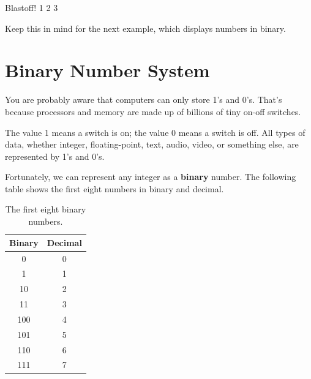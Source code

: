 \begin{stdout}
Blastoff!
1
2
3
\end{stdout}

Keep this in mind for the next example, which displays numbers in binary.

\section{Binary Number System}
\label{binary}

You are probably aware that computers can only store 1's and 0's.
That's because processors and memory are made up of billions of tiny on-off switches.

The value 1 means a switch is on; the value 0 means a switch is off.
All types of data, whether integer, floating-point, text, audio, video, or something else, are represented by 1's and 0's.


Fortunately, we can represent any integer as a {\bf binary} number.
The following table shows the first eight numbers in binary and decimal.


\begin{table}[!ht]
\begin{center}
\begin{tabular}{|c|c|}
\hline
Binary & Decimal \\
\hline
0 & 0 \\
\hline
1 & 1 \\
\hline
10 & 2 \\
\hline
11 & 3 \\
\hline
100 & 4 \\
\hline
101 & 5 \\
\hline
110 & 6 \\
\hline
111 & 7 \\
\hline
\end{tabular}
\caption{The first eight binary numbers.}
\label{tab:binary}
\end{center}
\end{table}



